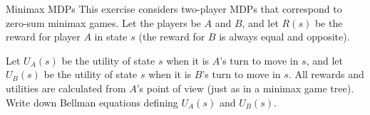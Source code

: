 \begin{problem}[]{Minimax MDPs}
This exercise considers two-player MDPs that correspond to zero-sum minimax games. Let the players be $A$ and $B$, and let $R(s)$ be the reward for player $A$ in state $s$ (the reward for $B$ is always equal and opposite).

\begin{question}[4]
Let $U_A(s)$ be the utility of state $s$ when it is $A$'s turn to move in $s$, and let $U_B(s)$ be the utility of state $s$ when it is $B$'s turn to move in $s$. All rewards and utilities are calculated from $A$'s point of view (just as in a minimax game tree). Write down Bellman equations defining $U_A(s)$ and $U_B(s)$. \\
\fbox{\begin{minipage}[t][7cm][t]{17cm}
\FiveA
\end{minipage}}
\end{question}
\end{problem}